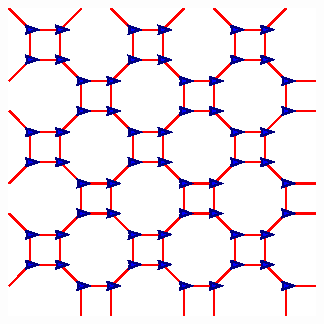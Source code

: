 \begin{columns}[T] %
  \begin{column}{.45\textwidth}
    
  \end{column}%
  \begin{column}{.45\textwidth}
    \begin{figure}
      \centering
      \includegraphics[width=0.75\columnwidth]{figs/octagonsquare}
    \end{figure}
  \end{column}%
\end{columns}